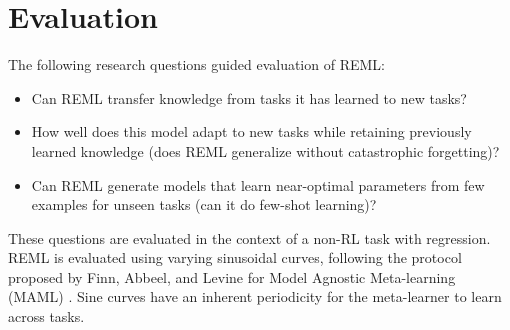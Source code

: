 \chapter{Evaluation}
\label{Evaluation}
The following research questions guided evaluation of REML:
\begin{itemize}
    \item Can REML transfer knowledge from tasks it has learned 
    to new tasks?
    \item How well does this model adapt to new tasks while retaining
    previously learned knowledge (does REML generalize without
    catastrophic forgetting)?
    \item Can REML generate models that learn near-optimal parameters 
    from few examples for unseen tasks (can it do few-shot learning)? 
\end{itemize}
These questions are evaluated in the context of a non-RL task with
regression. REML is evaluated using varying sinusoidal curves, following the protocol 
proposed by Finn, Abbeel, and Levine for Model Agnostic Meta-learning (MAML) 
\cite{FinAbbLev:17}. Sine curves have an inherent periodicity for the meta-learner
to learn across tasks.

